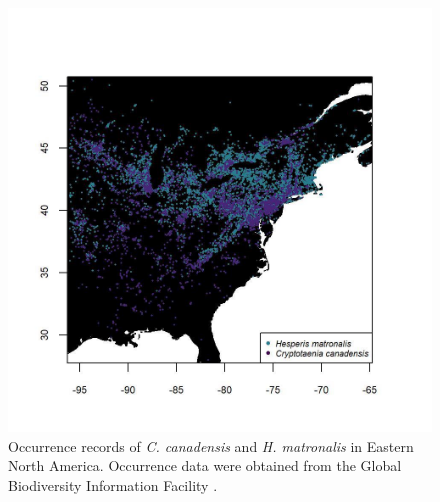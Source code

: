 \documentclass{article}[11pt]
\begin{document}
\begin{figure}[h!] %
    \centering
\includegraphics[width=.95\textwidth]{..//figure/cchhmmap4.jpeg}
\caption{Occurrence records of \textit{C. canadensis} and \textit{H. matronalis} in Eastern North America. Occurrence data were obtained from the Global Biodiversity Information Facility \citep[GBIF,][]{gbif}.} 
   \label{fig:map}
\end{figure}
\end{document}

